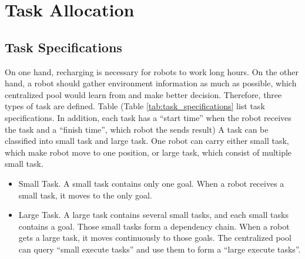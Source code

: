 \section{Task Allocation}

\subsection{Task Specifications}
\label{sec:task_specifications}
On one hand, recharging is necessary for robots to work long hours. On the other hand, a robot should gather environment information as much as possible, which centralized pool would learn from and make better decision. 
Therefore, three types of task are defined. Table (Table \ref{tab:task_specifications} list task specifications. In addition, each task has a ``start time'' when the robot receives the task and a ``finish time'', which robot the sends result)
A task can be classified into small task and large task. 
One robot can carry either small task, which make robot move to one position, or large task, which consist of multiple small task.
\begin{itemize}
	\item Small Task. A small task contains only one goal. When a robot receives a small task, it moves to the only goal. 
	\item Large Task. A large task contains several small tasks, and each small tasks contains a goal. Those small tasks form a dependency chain. When a robot gets a large task, it moves continuously to those goals. The centralized pool can query ``small execute tasks'' and use them to form a ``large execute tasks''.
\end{itemize}

\begin{table}[htb]
\centering
{}
\caption{Task Specifications}
\label{tab:task_specifications}
\end{table}



